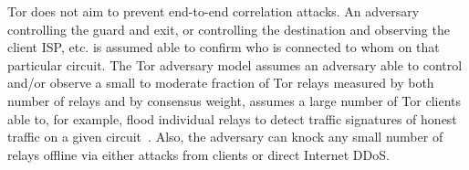 Tor does not aim to prevent end-to-end correlation attacks. An adversary
controlling the guard and exit, or controlling the destination and observing the
client ISP, etc. is assumed able to confirm who is connected to whom on that
particular circuit. The Tor adversary model assumes an adversary able to control
and/or observe a small to moderate fraction of Tor relays measured by both
number of relays and by consensus weight, assumes a large number of Tor clients
able to, for example, flood individual relays to detect traffic signatures of
honest traffic on a given circuit~\cite{long-paths}. Also, the adversary can
knock any small number of relays offline via either attacks from clients or
direct Internet DDoS\@. 
